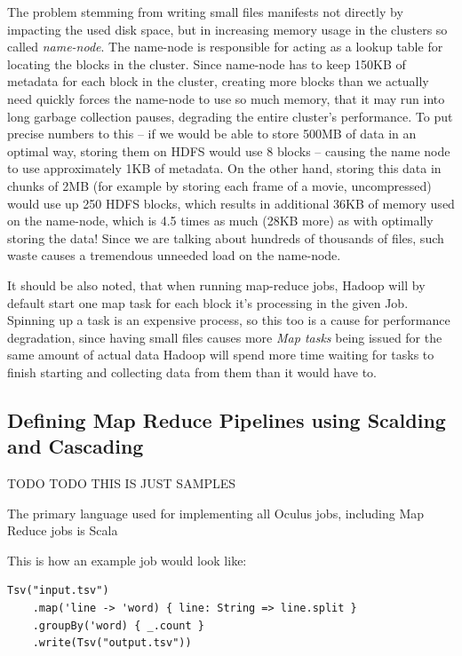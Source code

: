 The problem stemming from writing small files manifests not directly by impacting the used disk space, but in increasing memory usage in the clusters so called \textit{name-node}. The name-node is responsible for acting as a lookup table for locating the blocks in the cluster. Since name-node has to keep 150KB of metadata for each block in the cluster, creating more blocks than we actually need quickly forces the name-node to use so much memory, that it may run into long garbage collection pauses, degrading the entire cluster's performance. To put precise numbers to this -- if we would be able to store 500MB of data in an optimal way, storing them on HDFS would use 8 blocks -- causing the name node to use approximately 1KB of metadata. On the other hand, storing this data in chunks of 2MB (for example by storing each frame of a movie, uncompressed) would use up 250 HDFS blocks, which results in additional 36KB of memory used on the name-node, which is 4.5 times as much (28KB more) as with optimally storing the data! Since we are talking about hundreds of thousands of files, such waste causes a tremendous unneeded load on the name-node.

It should be also noted, that when running map-reduce jobs, Hadoop will by default start one map task for each block it's processing in the given Job. Spinning up a task is an expensive process, so this too is a cause for performance degradation, since having small files causes more \textit{Map tasks} being issued for the same amount of actual data Hadoop will spend more time waiting for tasks to finish starting and collecting data from them than it would have to.

\subsection{Defining Map Reduce Pipelines using Scalding and Cascading}
TODO TODO THIS IS JUST SAMPLES

The primary language used for implementing all Oculus jobs, including Map Reduce jobs is Scala \cite{scala}

This is how an example job would look like:

\begin{lstlisting}[caption={Simplest Scalding job used in Oculus -- each frame perceptual hashing}, label={lst:simplest-scalding-job}]
  Tsv("input.tsv")
    .map('line -> 'word) { line: String => line.split }
    .groupBy('word) { _.count }
    .write(Tsv("output.tsv"))
\end{lstlisting}


